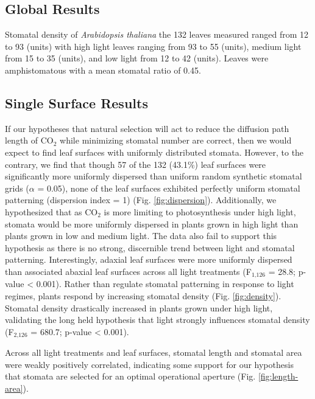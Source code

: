 \documentclass[12pt,halfline,a4paper,]{ouparticle}
\begin{document}
\hypertarget{global-results}{%
\subsection{Global Results}\label{global-results}}

Stomatal density of \emph{Arabidopsis thaliana} the 132 leaves measured
ranged from 12 to 93 (units) with high light leaves ranging from 93 to
55 (units), medium light from 15 to 35 (units), and low light from 12 to
42 (units). Leaves were amphistomatous with a mean stomatal ratio of
0.45.

\hypertarget{single-surface-results}{%
\subsection{Single Surface Results}\label{single-surface-results}}

If our hypotheses that natural selection will act to reduce the
diffusion path length of CO\(_2\) while minimizing stomatal number are
correct, then we would expect to find leaf surfaces with uniformly
distributed stomata. However, to the contrary, we find that though 57 of
the 132 (43.1\%) leaf surfaces were significantly more uniformly
dispersed than uniform random synthetic stomatal grids (\(\alpha\) =
0.05), none of the leaf surfaces exhibited perfectly uniform stomatal
patterning (dispersion index = 1) (Fig. \ref{fig:dispersion}).
Additionally, we hypothesized that as CO\(_2\) is more limiting to
photosynthesis under high light, stomata would be more uniformly
dispersed in plants grown in high light than plants grown in low and
medium light. The data also fail to support this hypothesis as there is
no strong, discernible trend between light and stomatal patterning.
Interestingly, adaxial leaf surfaces were more uniformly dispersed than
associated abaxial leaf surfaces across all light treatments
(F\(_\text{1,126}\) = 28.8; p-value \textless{} 0.001). Rather than
regulate stomatal patterning in response to light regimes, plants
respond by increasing stomatal density (Fig. \ref{fig:density}).
Stomatal density drastically increased in plants grown under high light,
validating the long held hypothesis that light strongly influences
stomatal density (F\(_\text{2,126}\) = 680.7; p-value \textless{}
0.001).

Across all light treatments and leaf surfaces, stomatal length and
stomatal area were weakly positively correlated, indicating some support
for our hypothesis that stomata are selected for an optimal operational
aperture (Fig. \ref{fig:length-area}).
\end{document}
